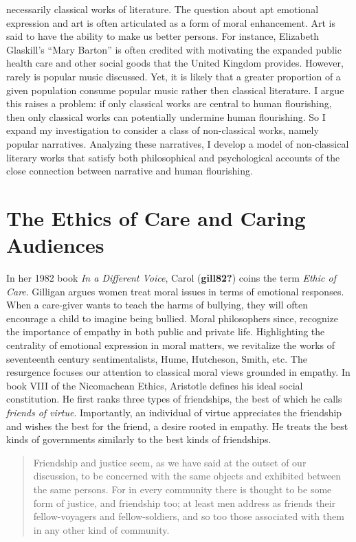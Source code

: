 \documentclass[12pt]{book}
\theoremstyle{definition}
\theoremstyle{remark}
\begin{document}
necessarily classical works of literature. The question about apt emotional expression and art is often articulated as a form of moral enhancement. Art is said to have the ability to make us better persons. For instance, Elizabeth Glaskill's ``Mary Barton'' is often credited with motivating the expanded public health care and other social goods that the United Kingdom provides. However, rarely is popular music discussed. Yet, it is likely that a greater proportion of a given population consume popular music rather then classical literature. I argue this raises a problem: if only classical works are central to human flourishing, then only classical works can potentially undermine human flourishing. So I expand my investigation to consider a class of non-classical works, namely popular narratives. Analyzing these narratives, I develop a model of non-classical literary works that satisfy both philosophical and psychological accounts of the close connection between narrative and human flourishing.

\section{The Ethics of Care and Caring Audiences}\label{the-ethics-of-care-and-caring-audiences-1}

In her 1982 book \emph{In a Different Voice}, Carol (\textbf{gill82?}) coins the term \emph{Ethic of Care}. Gilligan argues women treat moral issues in terms of emotional responses. When a care-giver wants to teach the harms of bullying, they will often encourage a child to imagine being bullied. Moral philosophers since, recognize the importance of empathy in both public and private life. Highlighting the centrality of emotional expression in moral matters, we revitalize the works of seventeenth century sentimentalists, Hume, Hutcheson, Smith, etc. The resurgence focuses our attention to classical moral views grounded in empathy. In book VIII of the Nicomachean Ethics, Aristotle defines his ideal social constitution. He first ranks three types of friendships, the best of which he calls \emph{friends of virtue}. Importantly, an individual of virtue appreciates the friendship and wishes the best for the friend, a desire rooted in empathy. He treats the best kinds of governments similarly to the best kinds of friendships.

\begin{quote}
Friendship and justice seem, as we have said at the outset of our discussion, to be concerned with the same objects and exhibited between the same persons. For in every community there is thought to be some form of justice, and friendship too; at least men address as friends their fellow-voyagers and fellow-soldiers, and so too those associated with them in any other kind of community.
\end{quote}
\end{document}
